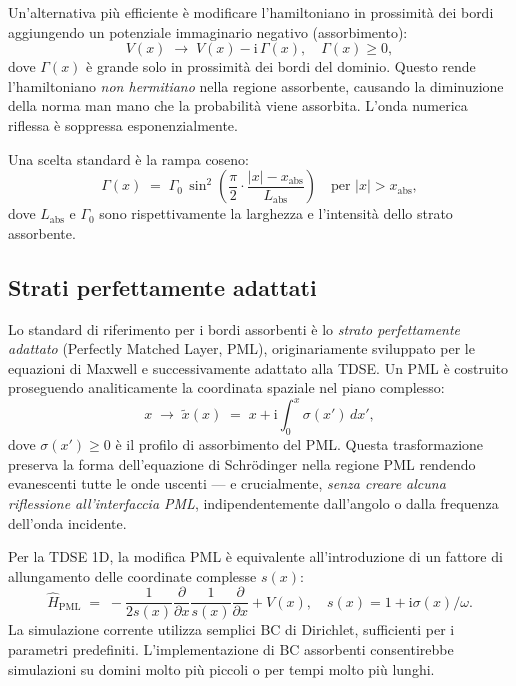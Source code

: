 \documentclass[12pt, a4paper]{article}
\newcommand{\ii}{\mathrm{i}}          %
\newcommand{\Htop}{\hat{H}}
\begin{document}
Un'alternativa più efficiente è modificare l'hamiltoniano in
prossimità dei bordi aggiungendo un potenziale immaginario negativo
(assorbimento):
\begin{equation}
  V(x) \;\to\; V(x) - \ii\,\Gamma(x),
  \quad \Gamma(x) \geq 0,
\end{equation}
dove $\Gamma(x)$ è grande solo in prossimità dei bordi del dominio.
Questo rende l'hamiltoniano \emph{non hermitiano} nella regione
assorbente, causando la diminuzione della norma man mano che la
probabilità viene assorbita.  L'onda numerica riflessa è
soppressa esponenzialmente.

Una scelta standard è la rampa coseno:
\begin{equation}
  \Gamma(x) \;=\;
  \Gamma_0\,\sin^2\!\left(\frac{\pi}{2}
  \cdot\frac{|x|-x_\text{abs}}{L_\text{abs}}\right)
  \quad \text{per } |x| > x_\text{abs},
\end{equation}
dove $L_\text{abs}$ e $\Gamma_0$ sono rispettivamente la larghezza
e l'intensità dello strato assorbente.

\subsection{Strati perfettamente adattati}

Lo standard di riferimento per i bordi assorbenti è lo
\emph{strato perfettamente adattato} (Perfectly Matched Layer, PML),
originariamente sviluppato per le equazioni di Maxwell
\cite{NumericalRecipes} e successivamente adattato alla TDSE.
Un PML è costruito proseguendo analiticamente la coordinata spaziale
nel piano complesso:
\begin{equation}
  x \;\to\; \tilde{x}(x) \;=\; x + \ii\int_0^x \sigma(x')\,dx',
\end{equation}
dove $\sigma(x') \geq 0$ è il profilo di assorbimento del PML.
Questa trasformazione preserva la forma dell'equazione di
Schr\"{o}dinger nella regione PML rendendo evanescenti tutte le onde
uscenti --- e crucialmente, \emph{senza creare alcuna riflessione
all'interfaccia PML}, indipendentemente dall'angolo o dalla frequenza
dell'onda incidente.

Per la TDSE 1D, la modifica PML è equivalente all'introduzione di un
fattore di allungamento delle coordinate complesse $s(x)$:
\begin{equation}
  \Htop_\text{PML} \;=\;
  -\frac{1}{2s(x)}\frac{\partial}{\partial x}\frac{1}{s(x)}\frac{\partial}{\partial x}
  + V(x),
  \quad s(x) = 1 + \ii\sigma(x)/\omega.
\end{equation}
La simulazione corrente utilizza semplici BC di Dirichlet, sufficienti
per i parametri predefiniti.  L'implementazione di BC assorbenti
consentirebbe simulazioni su domini molto più piccoli o per tempi
molto più lunghi.
\end{document}
